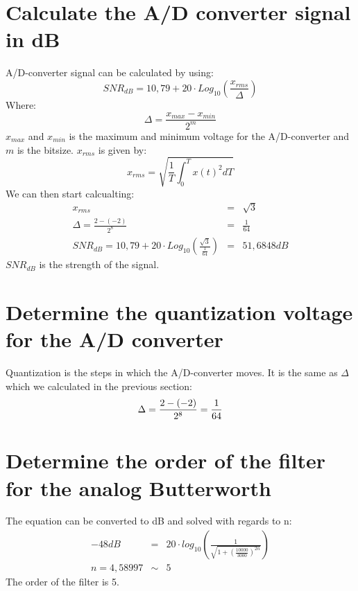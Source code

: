 \documentclass[a4wide,10pt]{article}
\begin{document}
\section{Calculate the A/D converter signal in dB} %
\label{sec:calculate_the_a_d_converter_signal_in_db}
A/D-converter signal can be calculated by using:
\begin{equation}
	SNR_{dB} = 10,79 + 20 \cdot Log_{10}(\frac{x_{rms}}{\Delta})
\end{equation}
Where:
\begin{equation}
	\Delta = \frac{x_{max} - x_{min}}{2^m}
\end{equation}
$x_{max}$ and $x_{min}$ is the maximum and minimum voltage for the A/D-converter and $m$ is the bitsize.
$x_{rms}$ is given by:
\begin{equation}
	x_{rms} = \sqrt{\frac{1}{T}\int_0^T x(t)^2 dT}
\end{equation}
We can then start calcualting:
\begin{eqnarray}
	x_{rms} &=& \sqrt{3} \nonumber \\
	\Delta = \frac{2 - (-2)}{2^8} &=& \frac{1}{64} \nonumber \\
	SNR_{dB} = 10,79 + 20 \cdot Log_{10}(\frac{\sqrt{3}}{\frac{1}{64}}) &=& 51,6848dB \nonumber
\end{eqnarray}
$SNR_{dB}$ is the strength of the signal.

\section{Determine the quantization voltage for the A/D converter} %
\label{sec:determine_the_quantization_voltage_for_the_a_d_converter}
Quantization is the steps in which the A/D-converter moves. It is the same as $\Delta$ which we calculated in the previous section:
\begin{equation}
	\Delta = \frac{2 - (-2)}{2^8} = \frac{1}{64} \nonumber \\
\end{equation}

\section{Determine the order of the filter for the analog Butterworth} %
\label{sec:determine_the_order_of_the_filter_for_the_analog_butterworth}
The equation can be converted to dB and solved with regards to n:
\begin{eqnarray}
	-48dB &=& 20 \cdot log_{10}(\frac{1}{\sqrt{1+(\frac{10000}{3000})^{2n}}}) \nonumber \\
	n = 4,58997 &\sim& 5 \nonumber
\end{eqnarray}
The order of the filter is 5.
\newpage
\end{document}
